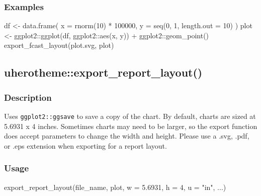 \documentclass[
  letterpaper,
  DIV=11,
  numbers=noendperiod]{scrreport}
\newenvironment{Shaded}{\begin{snugshade}}{\end{snugshade}}
\newcommand{\AttributeTok}[1]{\textcolor[rgb]{0.40,0.45,0.13}{#1}}
\newcommand{\DecValTok}[1]{\textcolor[rgb]{0.68,0.00,0.00}{#1}}
\newcommand{\FloatTok}[1]{\textcolor[rgb]{0.68,0.00,0.00}{#1}}
\newcommand{\FunctionTok}[1]{\textcolor[rgb]{0.28,0.35,0.67}{#1}}
\newcommand{\NormalTok}[1]{\textcolor[rgb]{0.00,0.23,0.31}{#1}}
\newcommand{\OtherTok}[1]{\textcolor[rgb]{0.00,0.23,0.31}{#1}}
\newcommand{\SpecialCharTok}[1]{\textcolor[rgb]{0.37,0.37,0.37}{#1}}
\newcommand{\StringTok}[1]{\textcolor[rgb]{0.13,0.47,0.30}{#1}}
\begin{document}
\subsubsection{Examples}\label{examples-78}

\begin{Shaded}
\begin{Highlighting}[]
\NormalTok{df }\OtherTok{\textless{}{-}} \FunctionTok{data.frame}\NormalTok{(}
  \AttributeTok{x =} \FunctionTok{rnorm}\NormalTok{(}\DecValTok{10}\NormalTok{) }\SpecialCharTok{*} \DecValTok{100000}\NormalTok{,}
  \AttributeTok{y =} \FunctionTok{seq}\NormalTok{(}\DecValTok{0}\NormalTok{, }\DecValTok{1}\NormalTok{, }\AttributeTok{length.out =} \DecValTok{10}\NormalTok{)}
\NormalTok{)}
\NormalTok{plot }\OtherTok{\textless{}{-}}\NormalTok{ ggplot2}\SpecialCharTok{::}\FunctionTok{ggplot}\NormalTok{(df, ggplot2}\SpecialCharTok{::}\FunctionTok{aes}\NormalTok{(x, y)) }\SpecialCharTok{+}\NormalTok{ ggplot2}\SpecialCharTok{::}\FunctionTok{geom\_point}\NormalTok{()}
\FunctionTok{export\_fcast\_layout}\NormalTok{(}\StringTok{\textquotesingle{}plot.svg\textquotesingle{}}\NormalTok{, plot)}
\end{Highlighting}
\end{Shaded}

\subsection{uherotheme::export\_report\_layout()}\label{uherothemeexport_report_layout}

\subsubsection{Description}\label{description-80}

Uses \texttt{ggplot2::ggsave} to save a copy of the chart. By default,
charts are sized at 5.6931 x 4 inches. Sometimes charts may need to be
larger, so the export function does accept parameters to change the
width and height. Please use a \textquotesingle.svg\textquotesingle,
\textquotesingle.pdf\textquotesingle, or
\textquotesingle.eps\textquotesingle{} extension when exporting for a
report layout.

\subsubsection{Usage}\label{usage-80}

\begin{Shaded}
\begin{Highlighting}[]
\FunctionTok{export\_report\_layout}\NormalTok{(file\_name, plot, }\AttributeTok{w =} \FloatTok{5.6931}\NormalTok{, }\AttributeTok{h =} \DecValTok{4}\NormalTok{, }\AttributeTok{u =} \StringTok{"in"}\NormalTok{, ...)}
\end{Highlighting}
\end{Shaded}
\end{document}
